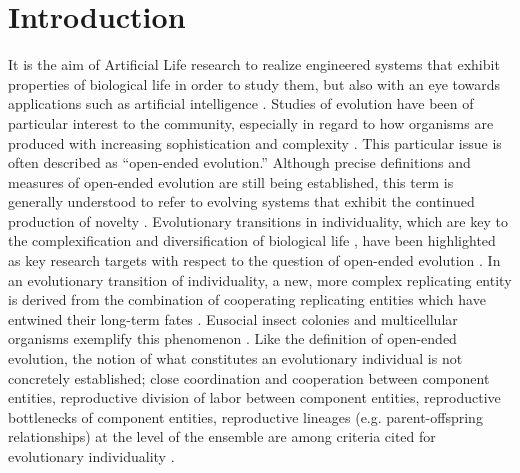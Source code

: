 \section{Introduction}

It is the aim of Artificial Life research to realize engineered systems that exhibit properties of biological life in order to study them, but also with an eye towards applications such as artificial intelligence \citep{bedau2003artificial}.
Studies of evolution have been of particular interest to the community, especially in regard to how organisms are produced with increasing sophistication and complexity \citep{goldsby2017increasing}.
This particular issue is often described as ``open-ended evolution.''
Although precise definitions and measures of open-ended evolution are still being established, this term is generally understood to refer to evolving systems that exhibit the continued production of novelty \citep{taylor2016open}.
Evolutionary transitions in individuality, which are key to the complexification and diversification of biological life \citep{smith1997major}, have been highlighted as key research targets with respect to the question of open-ended evolution \citep{ray1996evolving, banzhaf2016defining}.
In an evolutionary transition of individuality, a new, more complex replicating entity is derived from the combination of cooperating replicating entities which have entwined their long-term fates \citep{west2015major}.
Eusocial insect colonies and multicellular organisms exemplify this phenomenon \citep{smith1997major}.
Like the definition of open-ended evolution, the notion of what constitutes an evolutionary individual is not concretely established;
close coordination and cooperation between component entities, reproductive division of labor between component entities, reproductive bottlenecks of component entities, reproductive lineages (e.g. parent-offspring relationships) at the level of the ensemble are among criteria cited for evolutionary individuality
\citep{ereshefsky2015rethinking, bouchard2013symbiotic}.

